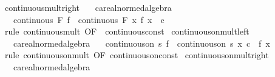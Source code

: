 \begin{isabellebody}
\ continuous{\isacharunderscore}{\kern0pt}mult{\isacharunderscore}{\kern0pt}right{\isacharcolon}{\kern0pt}\isanewline
\ \ \ c{\isacharcolon}{\kern0pt}{\isacharcolon}{\kern0pt}{\isachardoublequoteopen}{\isacharprime}{\kern0pt}a{\isacharcolon}{\kern0pt}{\isacharcolon}{\kern0pt}real{\isacharunderscore}{\kern0pt}normed{\isacharunderscore}{\kern0pt}algebra{\isachardoublequoteclose}\isanewline
\ \ \ {\isachardoublequoteopen}continuous\ F\ f\ {\isasymLongrightarrow}\ continuous\ F\ {\isacharparenleft}{\kern0pt}{\isasymlambda}x{\isachardot}{\kern0pt}\ f\ x\ {\isacharasterisk}{\kern0pt}\ c{\isacharparenright}{\kern0pt}{\isachardoublequoteclose}\isanewline
%
\isadelimproof
%
\endisadelimproof
%
\isatagproof
{}\isamarkupfalse%
\ {\isacharparenleft}{\kern0pt}rule\ continuous{\isacharunderscore}{\kern0pt}mult\ {\isacharbrackleft}{\kern0pt}OF\ {\isacharunderscore}{\kern0pt}\ continuous{\isacharunderscore}{\kern0pt}const{\isacharbrackright}{\kern0pt}{\isacharparenright}{\kern0pt}%
\endisatagproof
{\isafoldproof}%
%
\isadelimproof
\isanewline
%
\endisadelimproof
\isanewline
{}\isamarkupfalse%
\ continuous{\isacharunderscore}{\kern0pt}on{\isacharunderscore}{\kern0pt}mult{\isacharunderscore}{\kern0pt}left{\isacharcolon}{\kern0pt}\isanewline
\ \ \ c{\isacharcolon}{\kern0pt}{\isacharcolon}{\kern0pt}{\isachardoublequoteopen}{\isacharprime}{\kern0pt}a{\isacharcolon}{\kern0pt}{\isacharcolon}{\kern0pt}real{\isacharunderscore}{\kern0pt}normed{\isacharunderscore}{\kern0pt}algebra{\isachardoublequoteclose}\isanewline
\ \ \ {\isachardoublequoteopen}continuous{\isacharunderscore}{\kern0pt}on\ s\ f\ {\isasymLongrightarrow}\ continuous{\isacharunderscore}{\kern0pt}on\ s\ {\isacharparenleft}{\kern0pt}{\isasymlambda}x{\isachardot}{\kern0pt}\ c\ {\isacharasterisk}{\kern0pt}\ f\ x{\isacharparenright}{\kern0pt}{\isachardoublequoteclose}\isanewline
%
\isadelimproof
%
\endisadelimproof
%
\isatagproof
{}\isamarkupfalse%
\ {\isacharparenleft}{\kern0pt}rule\ continuous{\isacharunderscore}{\kern0pt}on{\isacharunderscore}{\kern0pt}mult\ {\isacharbrackleft}{\kern0pt}OF\ continuous{\isacharunderscore}{\kern0pt}on{\isacharunderscore}{\kern0pt}const{\isacharbrackright}{\kern0pt}{\isacharparenright}{\kern0pt}%
\endisatagproof
{\isafoldproof}%
%
\isadelimproof
\isanewline
%
\endisadelimproof
\isanewline
{}\isamarkupfalse%
\ continuous{\isacharunderscore}{\kern0pt}on{\isacharunderscore}{\kern0pt}mult{\isacharunderscore}{\kern0pt}right{\isacharcolon}{\kern0pt}\isanewline
\ \ \ c{\isacharcolon}{\kern0pt}{\isacharcolon}{\kern0pt}{\isachardoublequoteopen}{\isacharprime}{\kern0pt}a{\isacharcolon}{\kern0pt}{\isacharcolon}{\kern0pt}real{\isacharunderscore}{\kern0pt}normed{\isacharunderscore}{\kern0pt}algebra{\isachardoublequoteclose}\isanewline

\end{isabellebody}

